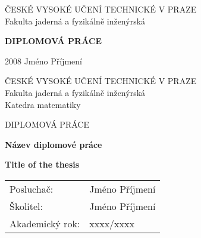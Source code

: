 \documentclass[11pt,a4paper,oneside]{book}
\begin{document}

\thispagestyle{empty}

\begin{center}

{\Large ČESKÉ VYSOKÉ UČENÍ TECHNICKÉ V PRAZE} \\[3.5mm]
{\Large Fakulta jaderná a fyzikálně inženýrská}


{\Huge\textbf{DIPLOMOVÁ PRÁCE}}


{\Large \hspace*{1cm} 2008 \hfill Jméno Příjmení \hspace*{1cm}}

\end{center}


\newpage

\thispagestyle{empty}

\begin{center}

{\Large ČESKÉ VYSOKÉ UČENÍ TECHNICKÉ V PRAZE} \\[3.5mm]
{\Large Fakulta jaderná a fyzikálně inženýrská} \\[3.5mm]
{\Large Katedra matematiky}


{\Large DIPLOMOVÁ PRÁCE}


{\LARGE
\textbf{Název diplomové práce}
\par}

\vspace{1cm}

{\LARGE
\textbf{Title of the thesis}
\par}


\end{center}

\begin{tabular}{ll} 
{\Large Posluchač:} & {\Large Jméno Příjmení} \\[1mm]
{\Large \v{S}kolitel:} & {\Large Jméno Příjmení} \\[2mm]
{\Large Akademický rok:}     & {\Large xxxx/xxxx}
\end{tabular}
\end{document}
